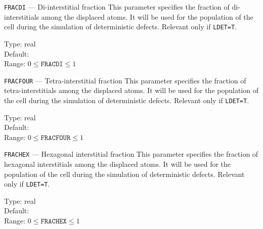 \ifprivate
\begin{keydescription}{\texttt{FRACDI} --- Di-interstitial fraction}
%
  This parameter specifies the fraction of di-interstitials among the
  displaced atoms. It will be used for the population of the cell during the
  simulation of deterministic defects. Relevant only if
  \texttt{LDET=T}.
  \begin{keytab}
    Type:    \> real \\
    Default:  \\
    Range:   \> $0 \le \texttt{FRACDI} \le 1$
  \end{keytab}
\end{keydescription}

\begin{keydescription}{\texttt{FRACFOUR} --- Tetra-interstitial fraction}
%
  This parameter specifies the fraction of tetra-interstitials among
  the displaced atoms. It will be used for the population of the cell during
  the simulation of deterministic defects. Relevant only if
  \texttt{LDET=T}. 
  \begin{keytab}
    Type:    \> real \\
    Default:  \\
    Range:   \> $0 \le \texttt{FRACFOUR} \le 1$
  \end{keytab}
\end{keydescription}

\begin{keydescription}{\texttt{FRACHEX} --- Hexagonal interstitial fraction}
%
  This parameter specifies the fraction of hexagonal interstitials
  among the displaced atoms. It will be used for the population of the cell
  during the simulation of deterministic defects. Relevant only if
  \texttt{LDET=T}. 
  \begin{keytab}
    Type:    \> real \\
    Default:  \\
    Range:   \> $0 \le \texttt{FRACHEX} \le 1$
  \end{keytab}
\end{keydescription}
\fi

